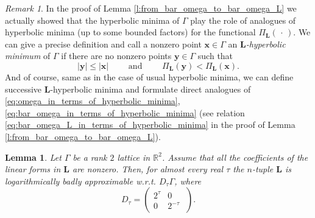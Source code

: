 \documentclass[a4paper,12pt]{article}
\theoremstyle{definition}
\theoremstyle{remark}
\newtheorem*{remark*}{Remark}
\theoremstyle{plain}
\newtheorem{lemma}{Lemma}
\renewcommand{\vec}[1]{\mathbf{#1}}
\renewcommand{\leq}{\leqslant}
\newcommand{\R}{\mathbb{R}}
\newcommand{\Ga}{\Gamma}
\newcommand{\bL}{\mathbf{L}}
\begin{document}
\begin{remark*}
  In the proof of Lemma \ref{l:from_bar_omega_to_bar_omega_L} we actually showed that the hyperbolic minima of $\Ga$ play the role of analogues of hyperbolic minima (up to some bounded factors) for the functional $\Pi_\bL(\,\cdot\,)$. We can give a precise definition and call a nonzero point $\vec x\in\Ga$ an \emph{$\bL$-hyperbolic minimum} of $\Ga$ if there are no nonzero points $\vec y\in\Ga$ such that
  \[
    |\vec y|\leq|\vec x|
    \qquad\text{ and }\qquad
    \Pi_\bL(\vec y)<\Pi_\bL(\vec x).
  \]
  And of course, same as in the case of usual hyperbolic minima, we can define successive $\bL$-hyperbolic minima and formulate direct analogues of \eqref{eq:omega_in_terms_of_hyperbolic_minima}, \eqref{eq:bar_omega_in_terms_of_hyperbolic_minima} (see relation \eqref{eq:bar_omega_L_in_terms_of_hyperbolic_minima} in the proof of Lemma \ref{l:from_bar_omega_to_bar_omega_L}). 
\end{remark*}

\begin{lemma}\label{l:providing_log_bad}
  Let $\Ga$ be a rank $2$ lattice in $\R^2$. Assume that all the coefficients of the linear forms in $\bL$ are nonzero. Then, for almost every real $\tau$ the $n$-tuple $\bL$ is logarithmically badly approximable w.r.t. $D_\tau\Ga$, where
  \[
    D_\tau=
    \begin{pmatrix}
      2^\tau & 0\phantom{-} \\
      0 & 2^{-\tau}
    \end{pmatrix}.
  \]
\end{lemma}
\end{document}

